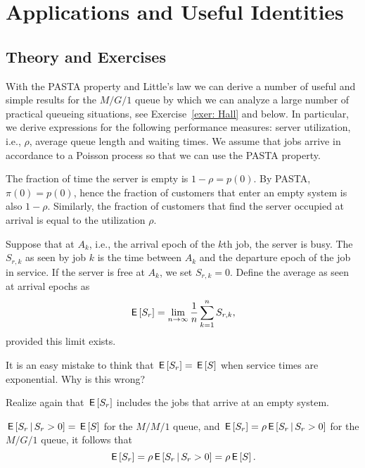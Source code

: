 \section{Applications and Useful Identities}
\label{sec:some-usef-ident}


\subsection*{Theory and Exercises}

With the PASTA property and Little's law we can derive a number of
useful and simple results for the $M/G/1$ queue by which we can analyze a large number of practical queueing situations, see Exercise~\ref{exer: Hall} and below. In particular, we derive expressions for  the following performance measures: server utilization, i.e., $\rho$, average queue length and waiting times. We assume that jobs arrive in accordance to a Poisson process so that we can use the PASTA property.


The fraction of time the server is empty is $1-\rho = p(0)$. By PASTA,
$\pi(0)=p(0)$, hence the fraction of customers that enter an empty
system is also $1-\rho$. Similarly, the fraction of customers that find the server occupied at arrival is equal to the utilization $\rho$. 



Suppose that at $A_k$, i.e., the arrival epoch of the $k$th job, the
server is busy.  The  $S_{r,k}$ as seen by job
$k$ is the time between $A_k$ and the departure epoch of the job in
service. If the server is free at $A_k$, we set $S_{r,k}=0$.  Define
the average  as seen at arrival epochs as
\begin{equation*}
  \,\mathsf{E}\left[S_r\right] = \lim_{n\to\infty} \frac1n \sum_{k=1}^n S_{r,k},
\end{equation*}
provided this limit exists. 

\begin{exercise}
  It is an easy mistake to think that $\,\mathsf{E}\left[S_r\right] = \,\mathsf{E}\left[S\right]$ when service
  times are exponential. Why is this wrong?
  \begin{hint}
Realize again that $\,\mathsf{E}\left[S_r\right]$ includes the jobs that arrive at an empty system.
  \end{hint}
  \begin{solution}
    $\,\mathsf{E}\left[S_r \,\middle|\, S_r>0\right] = \,\mathsf{E}\left[S\right]$ for the $M/M/1$ queue, and
    $\,\mathsf{E}\left[S_r\right] = \rho \,\mathsf{E}\left[S_r \,\middle|\, S_r>0\right]$ for the $M/G/1$ queue, it
    follows that
  \begin{equation*}
 \,\mathsf{E}\left[S_r\right] = \rho \,\mathsf{E}\left[S_r\,\middle|\, S_r>0\right] = \rho \,\mathsf{E}\left[S\right].
  \end{equation*}
  \end{solution}
\end{exercise}


